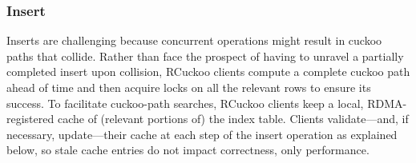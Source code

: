 
\subsubsection{Insert}
\label{sec:insert}

Inserts are challenging because concurrent operations might result in
cuckoo paths that collide.  Rather than face the prospect of having to
unravel a partially completed insert upon collision, RCuckoo clients
compute a complete cuckoo path ahead of time and then acquire locks on
all the relevant rows to ensure its success.  To facilitate
cuckoo-path searches, RCuckoo clients keep a local, RDMA-registered
cache of (relevant portions of) the index table.  Clients
validate---and, if necessary, update---their cache at each step of the
insert operation as explained below, so stale cache entries do not
impact correctness, only performance.







